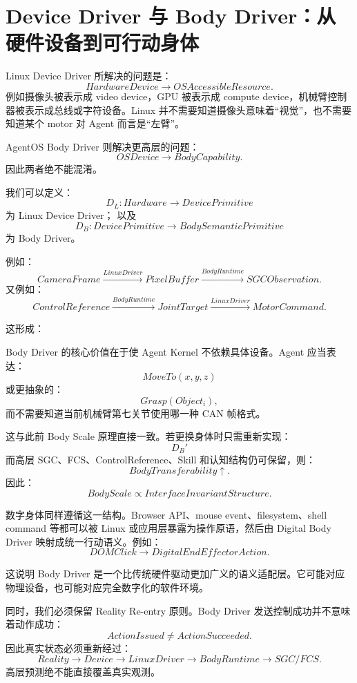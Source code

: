 \section{Device Driver 与 Body Driver：从硬件设备到可行动身体}

Linux Device Driver 所解决的问题是：
\[
HardwareDevice
\rightarrow
OSAccessibleResource.
\]
例如摄像头被表示成 video device，GPU 被表示成 compute device，机械臂控制器被表示成总线或字符设备。Linux 并不需要知道摄像头意味着“视觉”，也不需要知道某个 motor 对 Agent 而言是“左臂”。

AgentOS Body Driver 则解决更高层的问题：
\[
OSDevice
\rightarrow
BodyCapability.
\]
因此两者绝不能混淆。

我们可以定义：
\[
D_L:
Hardware
\rightarrow
DevicePrimitive
\]
为 Linux Device Driver；
以及
\[
D_B:
DevicePrimitive
\rightarrow
BodySemanticPrimitive
\]
为 Body Driver。

例如：
\[
CameraFrame
\xrightarrow{LinuxDriver}
PixelBuffer
\xrightarrow{BodyRuntime}
SGCObservation.
\]
又例如：
\[
ControlReference
\xrightarrow{BodyRuntime}
JointTarget
\xrightarrow{LinuxDriver}
MotorCommand.
\]

这形成：
\begin{statementbox}
\centering
{}
\end{statementbox}

Body Driver 的核心价值在于使 Agent Kernel 不依赖具体设备。Agent 应当表达：
\[
MoveTo(x,y,z)
\]
或更抽象的：
\[
Grasp(Object_i),
\]
而不需要知道当前机械臂第七关节使用哪一种 CAN 帧格式。

这与此前 Body Scale 原理直接一致。若更换身体时只需重新实现：
\[
D_B'
\]
而高层 SGC、FCS、ControlReference、Skill 和认知结构仍可保留，则：
\[
BodyTransferability\uparrow.
\]
因此：
\[
\boxed{
BodyScale
\propto
InterfaceInvariantStructure.
}
\]

数字身体同样遵循这一结构。Browser API、mouse event、filesystem、shell command 等都可以被 Linux 或应用层暴露为操作原语，然后由 Digital Body Driver 映射成统一行动语义。例如：
\[
DOMClick
\rightarrow
DigitalEndEffectorAction.
\]

这说明 Body Driver 是一个比传统硬件驱动更加广义的语义适配层。它可能对应物理设备，也可能对应完全数字化的软件环境。

同时，我们必须保留 Reality Re-entry 原则。Body Driver 发送控制成功并不意味着动作成功：
\[
ActionIssued\neq ActionSucceeded.
\]
因此真实状态必须重新经过：
\[
Reality
\rightarrow
Device
\rightarrow
LinuxDriver
\rightarrow
BodyRuntime
\rightarrow
SGC/FCS.
\]
高层预测绝不能直接覆盖真实观测。

